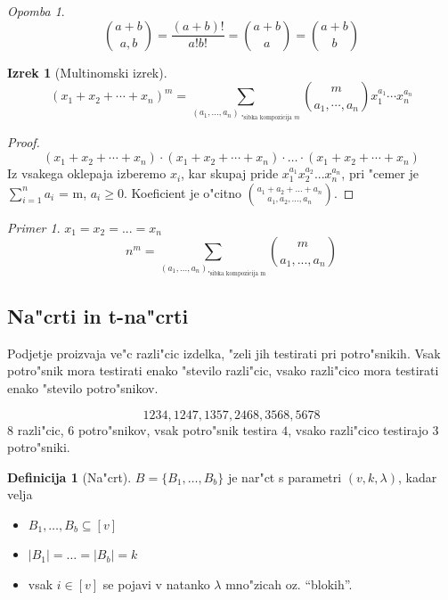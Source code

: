 \documentclass[a4paper,12pt]{article}
\theoremstyle{definition}
\newtheorem{defn}[counter]{Definicija}
\newtheorem{theorem}[counter]{Izrek}
\theoremstyle{remark}
\newtheorem*{ex}{Primer}
\newtheorem*{rem}{Opomba}
\begin{document}
\begin{rem}
	\[\binom{a+b}{a, b} = \frac{(a+b)!}{a!b!} = \binom{a+b}{a} = \binom{a+b}{b}\]
\end{rem}

\begin{theorem}[Multinomski izrek]
	\[(x_1 + x_2 + \cdots + x_n)^m = \sum_{(a_1, \ldots, a_n)_{\text{ "sibka kompozicija }m}} \binom{m}{a_1, \cdots, a_n} x_1^{a_1}\cdots x_n^{a_n}\]
\end{theorem}

\begin{proof}
	\[(x_1 + x_2 + \cdots + x_n)\cdot(x_1 + x_2 + \cdots + x_n)\cdot\ldots\cdot(x_1 + x_2 + \cdots + x_n)\]
	Iz vsakega oklepaja izberemo $x_i$, kar skupaj pride $x_1^{a_1} x_2^{a_2}...x_n^{a_n}$, pri "cemer je $\displaystyle \sum_{i = 1}^n a_i$ = m, $a_i \geqslant 0$. Koeficient je o"citno $\binom{a_1 + a_2 + ... + a_n}{a_1, a_2, ..., a_n}$.
\end{proof}

\begin{ex}
	$x_1 = x_2 = ... = x_n$
	\[n^m = \sum_{(a_1, ..., a_n)_{\text{"sibka kompozicija m}}} \binom{m}{a_1, ..., a_n}\]
\end{ex}


\subsection{Na"crti in t-na"crti}
Podjetje proizvaja ve"c razli"cic izdelka, "zeli jih testirati pri potro"snikih. Vsak potro"snik mora testirati enako "stevilo razli"cic, vsako razli"cico mora testirati enako "stevilo potro"snikov.

\[1234, 1247, 1357, 2468, 3568, 5678\]
$8$ razli"cic, $6$ potro"snikov, vsak potro"snik testira $4$, vsako razli"cico testirajo $3$ potro"sniki.

\begin{defn}[Na"crt]
	$B = \{B_1, \ldots, B_b\}$ je nar"ct s parametri $(v, k, \lambda)$, kadar velja
	\begin{itemize}
		\item $B_1, \ldots, B_b \subseteq [v]$
		\item $|B_1| = \ldots = |B_b| = k$
		\item vsak $i \in [v]$ se pojavi v natanko $\lambda$ mno"zicah oz. ``blokih''.
	\end{itemize}
\end{defn}
\end{document}

